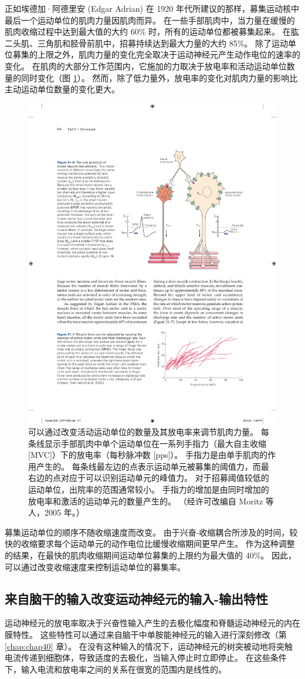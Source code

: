正如埃德加·阿德里安 (Edgar Adrian) 在 1920 年代所建议的那样，募集运动核中最后一个运动单位的肌肉力量因肌肉而异。 在一些手部肌肉中，当力量在缓慢的肌肉收缩过程中达到最大值的大约 60\% 时，所有的运动单位都被募集起来。 在肱二头肌、三角肌和胫骨前肌中，招募持续达到最大力量的大约 85\%。 除了运动单位募集的上限之外，肌肉力量的变化完全取决于运动神经元产生动作电位的速率的变化。 
在肌肉的大部分工作范围内，它施加的力取决于放电率和活动运动单位数量的同时变化（图 \ref{fig:31_7}）。 
然而，除了低力量外，放电率的变化对肌肉力量的影响比主动运动单位数量的变化更大。

\begin{figure}[htbp]
	\centering
	\includegraphics[width=0.5\linewidth]{chap31/fig_31_7}
	\caption{可以通过改变活动运动单位的数量及其放电率来调节肌肉力量。 每条线显示手部肌肉中单个运动单位在一系列手指力（最大自主收缩 [MVC]）下的放电率（每秒脉冲数 [pps]）。 手指力是由单手肌肉的作用产生的。 每条线最左边的点表示运动单元被募集的阈值力，而最右边的点对应于可以识别运动单元的峰值力。 对于招募阈值较低的运动单位，出院率的范围通常较小。 手指力的增加是由同时增加的放电率和激活的运动单元的数量产生的。 （经许可改编自 Moritz 等人，2005 年。）}
	\label{fig:31_7}
\end{figure}

募集运动单位的顺序不随收缩速度而改变。 由于兴奋-收缩耦合所涉及的时间，较快的收缩要求每个运动单元的动作电位比缓慢收缩期间更早产生。 作为这种调整的结果，在最快的肌肉收缩期间运动单位募集的上限约为最大值的 40\%。 因此，可以通过改变收缩速度来控制运动单位的募集率。


\subsection{来自脑干的输入改变运动神经元的输入-输出特性}
运动神经元的放电率取决于兴奋性输入产生的去极化幅度和脊髓运动神经元的内在膜特性。 这些特性可以通过来自脑干中单胺能神经元的输入进行深刻修改（第 \ref{chap:chap40} 章）。 在没有这种输入的情况下，运动神经元的树突被动地将突触电流传递到细胞体，导致适度的去极化，当输入停止时立即停止。 在这些条件下，输入电流和放电率之间的关系在很宽的范围内是线性的。

